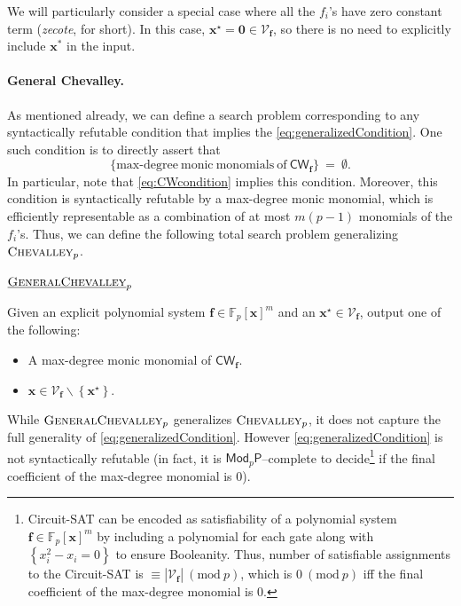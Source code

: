 \documentclass[10pt,a4paper]{article}
\theoremstyle{definition}
\theoremstyle{remark}
\newcommand{\inparen}[1]{\left ( #1 \right )}
\renewcommand{\mod}[1]{~\inparen{\mathrm{mod}~#1}}
\def\set#1{\left\{#1\right\}}
\newcommand{\bbF}{\ensuremath{\mathbb{F}}}
\newcommand{\calV}{\mathcal{V}}
\newcommand{\vecf}{\ensuremath{\boldsymbol{f}}}
\newcommand{\vecx}{\ensuremath{\boldsymbol{x}}}
\newcommand{\pnum}{p}
\newcommand{\lChevalleyp}{\textsc{GeneralChevalley}_{\pnum}}
\newcommand{\eChevalleyp}{\textsc{Chevalley}_{\pnum}}
\newcommand{\lChevalley}{\textsc{GeneralChevalley}}
\newcommand{\CW}{\mathsf{CW}}
\begin{document}
\noindent We will particularly consider a special case where all the $f_i$'s have zero constant term
({\em zecote}, for short). In this case, $\vecx^{\star} = \mathbf{0} \in \calV_{\vecf}$, so there is no need to explicitly include $\vecx^*$ in the input.

\paragraph{General Chevalley.} As mentioned already, we can define a search problem corresponding to any syntactically refutable condition that implies the
\eqref{eq:generalizedCondition}. One such condition is to directly assert that\vspace{-2.5mm}
\begin{equation}
	\tag{General CW Condition}
	\{\mathrm{max\text{-}degree~monic~monomials~of~} \CW_{\vecf}\} ~=~ \emptyset. \label{eq:generalCWCondition}
\end{equation}
In particular, note that \eqref{eq:CWcondition} implies this condition. Moreover, this condition is syntactically refutable by a max-degree monic monomial, which is efficiently representable as a combination of at most $m(p-1)$ monomials of the $f_i$'s. Thus, we can define the following total search problem generalizing $\eChevalleyp$.\medskip

\noindent $\underbar{\lChevalley}_{\pnum}$

\noindent Given an explicit polynomial system $\vecf \in \bbF_p[\vecx]^m$ and an
$\vecx^{\star} \in \calV_{\vecf}$, output one of the following:\vspace{-0.5mm}
\begin{itemize}
	\item[$\triangleright$] [{\em Refuting Witness}] A max-degree monic monomial of $\CW_{\vecf}$.
	\item[$\triangleright$] $\vecx \in \calV_{\vecf} \smallsetminus \set{\vecx^{\star}}$.
\end{itemize}
\medskip

\noindent While $\lChevalleyp$ generalizes $\eChevalleyp$, it does not
capture the full generality of \eqref{eq:generalizedCondition}. However \eqref{eq:generalizedCondition} is not syntactically refutable (in fact, it is $\mathsf{Mod}_p\mathsf{P}$--complete to decide\footnote{Circuit-SAT can be encoded as satisfiability of a polynomial system $\vecf \in \bbF_p[\vecx]^m$ by including a polynomial for each gate along with $\set{x_i^2 - x_i = 0}$ to ensure Booleanity. Thus, number of satisfiable assignments to the Circuit-SAT is $\equiv |\calV_{\vecf}| \mod{p}$, which is $0 \mod{p}$ iff the final coefficient of the max-degree monomial is $0$.} if the final coefficient of the max-degree monomial is $0$).
\end{document}
